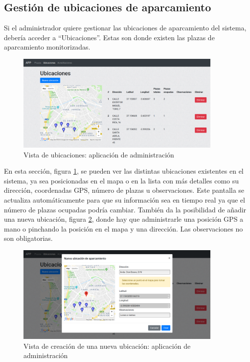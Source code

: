 \subsection{Gestión de ubicaciones de aparcamiento}
Si el administrador quiere gestionar las ubicaciones de aparcamiento del sistema, debería acceder a ``Ubicaciones''. Estas son donde existen las plazas de aparcamiento monitorizadas.
\begin{figure}[H]
	\centering
	\includegraphics[width=0.9\textwidth]{imagenes/administracion/ubicaciones.png}
	\caption{Vista de ubicaciones: aplicación de administración}
	\label{administracion_ubicaciones}
\end{figure}
En esta sección, figura \ref{administracion_ubicaciones}, se pueden ver las distintas ubicaciones existentes en el sistema, ya sea posicionadas en el mapa o en la lista con más detalles como su dirección, coordenadas GPS, número de plazas u observaciones. Este pantalla se actualiza automáticamente para que su información sea en tiempo real ya que el número de plazas ocupadas podría cambiar. También da la posibilidad de añadir una nueva ubicación, figura \ref{administracion_ubicaciones_nueva}, donde hay que administrarle una posición GPS a mano o pinchando la posición en el mapa y una dirección. Las observaciones no son obligatorias.
\begin{figure}[H]
	\centering
	\includegraphics[width=0.9\textwidth]{imagenes/administracion/ubicaciones_nueva.png}
	\caption{Vista de creación de una nueva ubicación: aplicación de administración}
	\label{administracion_ubicaciones_nueva}
\end{figure}

